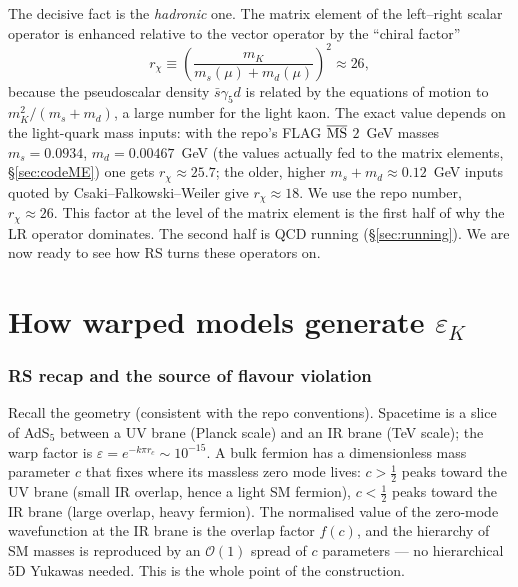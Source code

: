 \documentclass[11pt]{article}
\newcommand{\half}{\tfrac{1}{2}}
\newcommand{\eps}{\varepsilon}
\theoremstyle{definition}
\begin{document}
The decisive fact is the \emph{hadronic} one. The matrix element of the
left--right scalar operator is enhanced relative to the vector operator by the
``chiral factor''
\begin{equation}
r_\chi \equiv \left(\frac{m_K}{m_s(\mu)+m_d(\mu)}\right)^2 \approx 26 ,
\label{eq:chiral}
\end{equation}
because the pseudoscalar density $\bar s\gamma_5 d$ is related by the equations
of motion to $m_K^2/(m_s+m_d)$, a large number for the light kaon. The exact value
depends on the light-quark mass inputs: with the repo's FLAG $\overline{\rm MS}$
$2$~GeV masses $m_s=0.0934$, $m_d=0.00467$~GeV (the values actually fed to the
matrix elements, \S\ref{sec:codeME}) one gets $r_\chi\approx25.7$; the older,
higher $m_s+m_d\approx0.12$~GeV inputs quoted by Csaki--Falkowski--Weiler give
$r_\chi\approx18$. We use the repo number, $r_\chi\approx26$. This factor at the
level of the matrix element is the first half of why the LR operator dominates.
The second half is QCD running (\S\ref{sec:running}). We are now ready to see how
RS turns these operators on.

\part{How warped models generate $\varepsilon_K$}
\label{part:rs}

\section{RS recap and the source of flavour violation}
\label{sec:rsrecap}

Recall the geometry (consistent with the repo conventions). Spacetime is a slice
of AdS$_5$ between a UV brane (Planck scale) and an IR brane (TeV scale); the warp
factor is $\eps = e^{-k\pi r_c}\sim10^{-15}$. A bulk fermion has a dimensionless
mass parameter $c$ that fixes where its massless zero mode lives: $c>\half$ peaks
toward the UV brane (small IR overlap, hence a light SM fermion), $c<\half$ peaks
toward the IR brane (large overlap, heavy fermion). The normalised value of the
zero-mode wavefunction at the IR brane is the overlap factor $f(c)$, and the
hierarchy of SM masses is reproduced by an $\mathcal{O}(1)$ spread of $c$
parameters --- no hierarchical 5D Yukawas needed. This is the whole point of the
construction.
\end{document}
